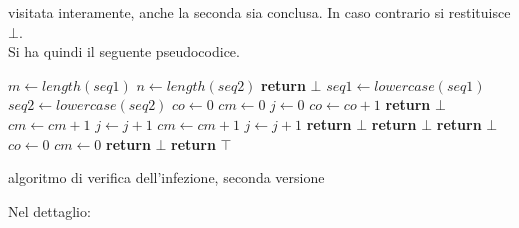 \documentclass[a4paper,12pt, oneside]{book}
\begin{document}
visitata interamente, anche la seconda sia conclusa. In caso contrario si
restituisce $\bot$.\\
Si ha quindi il seguente pseudocodice.
\begin{algorithm}[H]
  \small
  \begin{algorithmic}[1]
    \State $m \gets length(seq1)$
    \State $n \gets length(seq2)$
    \State \textbf{return} $\bot$
    \EndIf
    \State $seq1\gets lowercase(seq1)$
    \State $seq2\gets lowercase(seq2)$
    \State $co \gets 0$
    \State $cm \gets 0$
    \State $j \gets 0$
    \State $co \gets co+1$
    \State \textbf{return} $\bot$
    \EndIf
    \State $cm \gets cm+1$
    \State $j \gets j+1$
    \EndWhile
    \State $cm \gets cm+1$
    \State $j \gets j+1$
    \State \textbf{return} $\bot$
    \State \textbf{return} $\bot$
    \State \textbf{return} $\bot$
    \EndIf
    \State $co \gets 0$
    \State $cm \gets 0$
    \State  \textbf{return} $\bot$
    \EndIf
    \EndIf
    \EndFor
    \State \textbf{return} $\top$
    \EndFunction
  \end{algorithmic}
  \caption{algoritmo di verifica dell'infezione, seconda versione}
\end{algorithm}
\newpage
Nel dettaglio:
\end{document}
